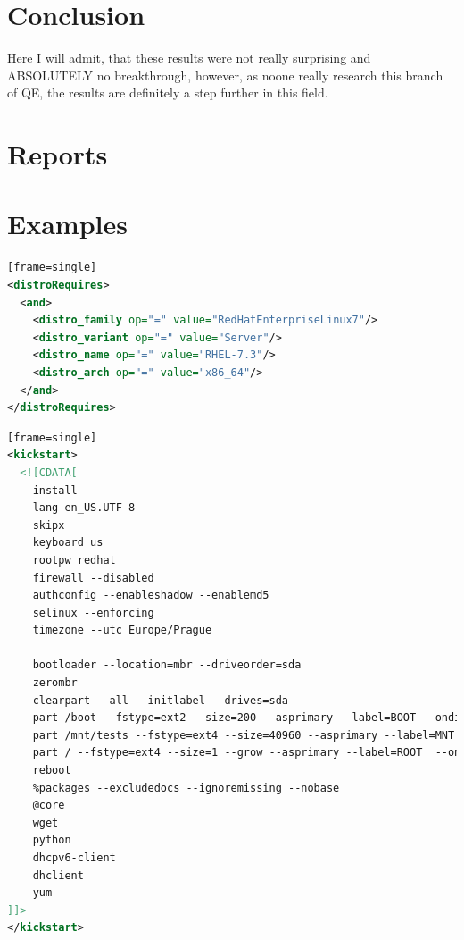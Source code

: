 \documentclass[
  color, %
  table, %
  lof,   %
  lot,   %
]{fithesis3}
\begin{document}
\chapter{Conclusion}
Here I will admit, that these results were not really surprising and ABSOLUTELY no breakthrough, however, as noone really research this branch of QE, the results are definitely a step further in this field.

\printbibliography

\appendix %
\chapter{Reports}
\chapter{Examples}


\begin{lstlisting}[language=xml, caption={Specifying OS to be installed}][frame=single]
<distroRequires>
  <and>
    <distro_family op="=" value="RedHatEnterpriseLinux7"/>
    <distro_variant op="=" value="Server"/>
    <distro_name op="=" value="RHEL-7.3"/>
    <distro_arch op="=" value="x86_64"/>
  </and>
</distroRequires>
\end{lstlisting}

\begin{lstlisting}[language=xml, caption={Configuring environment using kickstart}][frame=single]
<kickstart>
  <![CDATA[
    install
    lang en_US.UTF-8
    skipx
    keyboard us
    rootpw redhat
    firewall --disabled
    authconfig --enableshadow --enablemd5
    selinux --enforcing
    timezone --utc Europe/Prague

    bootloader --location=mbr --driveorder=sda
    zerombr
    clearpart --all --initlabel --drives=sda
    part /boot --fstype=ext2 --size=200 --asprimary --label=BOOT --ondisk=sda
    part /mnt/tests --fstype=ext4 --size=40960 --asprimary --label=MNT --ondisk=sda
    part / --fstype=ext4 --size=1 --grow --asprimary --label=ROOT  --ondisk=sda
    reboot
    %packages --excludedocs --ignoremissing --nobase
    @core
    wget
    python
    dhcpv6-client
    dhclient
    yum
]]>
</kickstart>
\end{lstlisting}
\end{document}
